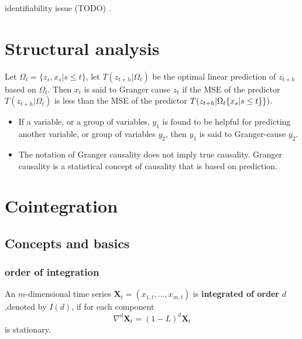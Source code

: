 \begin{remark}
identifiability issue (TODO) \cite[128]{tsay2013multivariate}.
\end{remark}

\section{Structural analysis}

\begin{definition}\cite[42]{lutkepohl2005new}
Let $\Omega_t = \{z_s,x_s|s\leq t\}$, let $T(z_{t+h}|\Omega_t)$ be the optimal linear prediction of $z_{t+h}$ based on $\Omega_t$. Then $x_t$ is said to Granger cause $z_t$ if the MSE of the predictor $T(z_{t+h}|\Omega_t)$ is less than the MSE of the predictor $T(z_{t+h}|\Omega_{t} \\ \{x_s|s\leq t\}\})$.
\end{definition}


\begin{remark}[interpretation]\hfill
\begin{itemize}
\item If a variable, or a group of variables, $y_1$ is found to be helpful for predicting another variable, or group of variables $y_2$, then $y_1$ is said to Granger-cause $y_2$.
\item The notation of Granger causality does not imply true causality. Granger causality is a statistical concept of causality that is based on prediction. 
\end{itemize}
\end{remark}



\section{Cointegration}
\subsection{Concepts and basics}
\subsubsection{order of integration}
\begin{definition}\cite[559]{hayashi2000econometrics}
An $m$-dimensional time series $\bm{X}_t = (x_{1,t},...,x_{m,t})$ is \textbf{integrated of order }$d$,denoted by $I(d)$, if
for each component 
$$\nabla^d \bm{X}_t = (1-L)^d\bm{X}_t$$
is stationary.
\end{definition}

